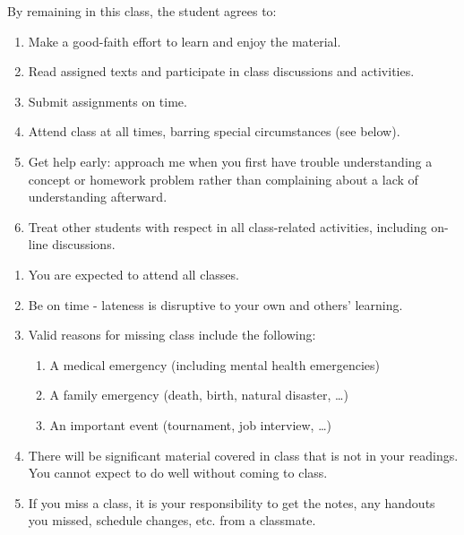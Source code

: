 \documentclass[a4paper,landscape,headrule,footrule]{foils}
\begin{document}








By remaining in this class, the student agrees to:
\begin{enumerate}
\item  Make a good-faith effort to learn and enjoy the material.
\item  Read assigned texts and participate in class discussions and activities.
\item Submit assignments on time.
\item Attend class at all times, barring special circumstances (see below).
\item Get help early: approach me when you first have trouble understanding a concept or homework problem rather than complaining about a lack of understanding afterward.
\item Treat other students with respect in all class-related activities, including on-line discussions.
\end{enumerate}
\begin{enumerate}
\item You are expected to attend all classes.
\item Be on time - lateness is disruptive to your own and others' learning.
\item Valid reasons for missing class include the following:
\begin{enumerate}
\item A medical emergency (including mental health emergencies)
\item A family emergency (death, birth, natural disaster,  \ldots{})
\item An important event (tournament, job interview, \ldots{})
\end{enumerate}
\item There will be significant material covered in class that is not in your readings.  You cannot expect to do well without coming to class.
\item If you miss a class, it is your responsibility to get the notes, any handouts you missed, schedule changes, etc. from a classmate.
\end{enumerate}
\end{document}
